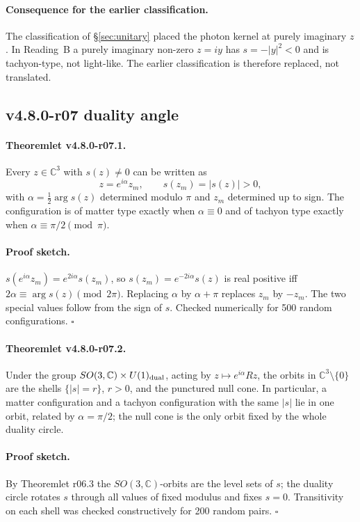 \paragraph{Consequence for the earlier classification.}
The classification of \S\ref{sec:unitary} placed the photon kernel at purely imaginary \(z\).  In
Reading~B a purely imaginary non-zero \(z=iy\) has \(s=-|y|^2<0\) and is tachyon-type, not
light-like.  The earlier classification is therefore replaced, not translated.

\subsection*{v4.8.0-r07 duality angle}
\label{subsec:v480-r07-duality-angle}

\paragraph{Theoremlet v4.8.0-r07.1.}
Every \(z\in\mathbb C^3\) with \(s(z)\neq0\) can be written as
\[
z=e^{i\alpha}z_m,\qquad s(z_m)=|s(z)|>0,
\]
with \(\alpha=\tfrac12\arg s(z)\) determined modulo \(\pi\) and \(z_m\) determined up to sign.
The configuration is of matter type exactly when \(\alpha\equiv0\) and of tachyon type exactly when
\(\alpha\equiv\pi/2\pmod\pi\).

\paragraph{Proof sketch.}
\(s(e^{i\alpha}z_m)=e^{2i\alpha}s(z_m)\), so \(s(z_m)=e^{-2i\alpha}s(z)\) is real positive iff
\(2\alpha\equiv\arg s(z)\pmod{2\pi}\).  Replacing \(\alpha\) by \(\alpha+\pi\) replaces \(z_m\) by
\(-z_m\).  The two special values follow from the sign of \(s\).  Checked numerically for 500 random
configurations.  \(\square\)

\paragraph{Theoremlet v4.8.0-r07.2.}
Under the group \(SO(3,\mathbb C)\times U(1)_{\rm dual}\), acting by \(z\mapsto e^{i\alpha}Rz\), the
orbits in \(\mathbb C^3\setminus\{0\}\) are the shells \(\{|s|=r\}\), \(r>0\), and the punctured null
cone.  In particular, a matter configuration and a tachyon configuration with the same \(|s|\) lie in
one orbit, related by \(\alpha=\pi/2\); the null cone is the only orbit fixed by the whole duality
circle.

\paragraph{Proof sketch.}
By Theoremlet r06.3 the \(SO(3,\mathbb C)\)-orbits are the level sets of \(s\); the duality circle
rotates \(s\) through all values of fixed modulus and fixes \(s=0\).  Transitivity on each shell was
checked constructively for 200 random pairs.  \(\square\)


